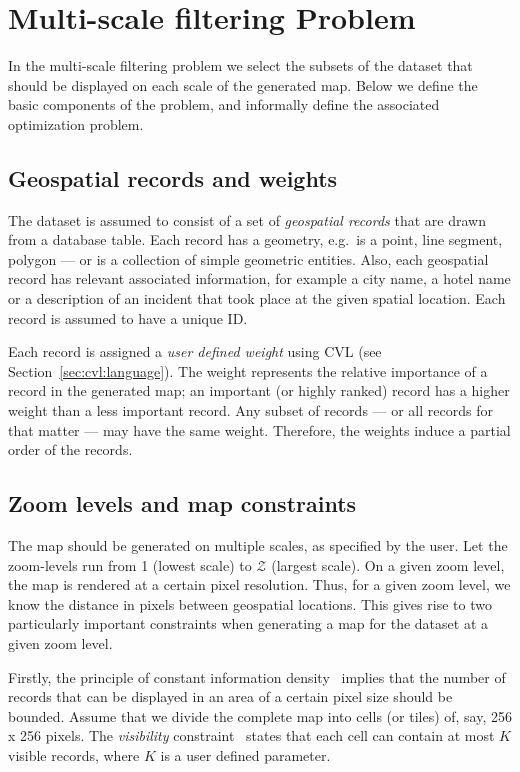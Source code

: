\section{Multi-scale filtering Problem}
\label{sec:background}

In the multi-scale filtering problem we select the subsets of the dataset that should be displayed on each scale of the generated map. Below we define the basic components of the problem, and informally define the associated optimization problem. 

\subsection{Geospatial records and weights}
\label{sec:records}

The dataset is assumed to consist of a set of \emph{geospatial records} that are drawn from a database table. Each record has a geometry, e.g.\ is a point, line segment, polygon --- or is a collection of simple geometric entities. Also, each geospatial record has relevant associated information, for example a city name, a hotel name or a description of an incident that took place at the given spatial location. Each record is assumed to have a unique ID.

Each record is assigned a \emph{user defined weight} using CVL (see Section~\ref{sec:cvl:language}). The weight represents the relative importance of a record in the generated map; an important (or highly ranked) record has a higher weight than a less important record. Any subset of records --- or all records for that matter --- may have the same weight. Therefore, the weights induce a partial order of the records.

\subsection{Zoom levels and map constraints}
\label{sec:zoomlevels}

The map should be generated on multiple scales, as specified by the user. Let the zoom-levels run from 1 (lowest scale) to $\mathcal{Z}$ (largest scale). On a given zoom level, the map is rendered at a certain pixel resolution. Thus, for a given zoom level, we know the distance in pixels between geospatial locations. This gives rise to two particularly important constraints when generating a map for the dataset at a given zoom level.

Firstly, the principle of constant information density~\cite{topfer1966principles} implies that the number of records that can be displayed in an area of a certain pixel size should be bounded. Assume that we divide the complete map into cells (or tiles) of, say, 256 x 256 pixels. The \emph{visibility} constraint~\cite{sarma2012fusiontables} states that each cell can contain at most $K$ visible records, where $K$ is a user defined parameter.

